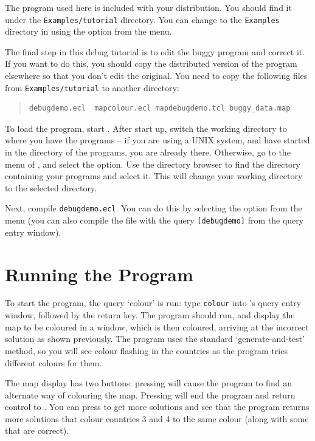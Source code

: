 The program used here is included with your {\eclipse} distribution. You
should find it under the \texttt{Examples/tutorial} directory. You can
change to the \texttt{Examples} directory in {\tkeclipse} using the
 option from the  menu.

The final step in this debug tutorial is to edit the buggy program and
correct it. If you want to do this, you should copy the distributed version
of the program elsewhere so that you don't edit the original. You need to
copy the following files from \verb'Examples/tutorial' to another directory:

\begin{quote}\begin{verbatim}
debugdemo.ecl  mapcolour.ecl mapdebugdemo.tcl buggy_data.map
\end{verbatim}\end{quote}

To load the program, start {\tkeclipse}. After start up, 
switch the working directory to
where you have the programs -- if you are using a UNIX system, and have
started {\tkeclipse} in the directory of the programs, you are already
there. Otherwise, go to the  menu of {\tkeclipse}, and select
the  option. Use the directory browser to find
the directory containing your programs and select it. This will change your
working directory to the selected directory.

Next, compile \verb'debugdemo.ecl'. You can do this by selecting the
 option from the  menu (you can also compile
the file with the query \verb'[debugdemo]' from the query entry
window). 

\section{Running the Program}
To start the program, the query `colour' is run: type \verb'colour' 
into {\tkeclipse}'s query entry window, followed by the
return key. The program should run, and display the map to be coloured in a
window, which is then coloured, arriving at the
incorrect solution as shown previously. The program uses
the standard `generate-and-test' method, so you will see colour flashing in
the countries as the program tries different colours for them.

The map display has two buttons: pressing  will cause the program to
find an alternate way of colouring the map. Pressing  will end the
program and return control to {\eclipse}. You can press  to get more
solutions and see that the program returns more solutions that colour
countries 3 and 4 to the same colour (along with some that are correct).

